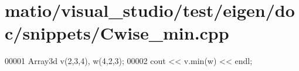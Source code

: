 \hypertarget{matio_2visual__studio_2test_2eigen_2doc_2snippets_2_cwise__min_8cpp_source}{}\section{matio/visual\+\_\+studio/test/eigen/doc/snippets/\+Cwise\+\_\+min.cpp}
\label{matio_2visual__studio_2test_2eigen_2doc_2snippets_2_cwise__min_8cpp_source}

\begin{DoxyCode}
00001 Array3d v(2,3,4), w(4,2,3);
00002 cout << v.min(w) << endl;
\end{DoxyCode}
